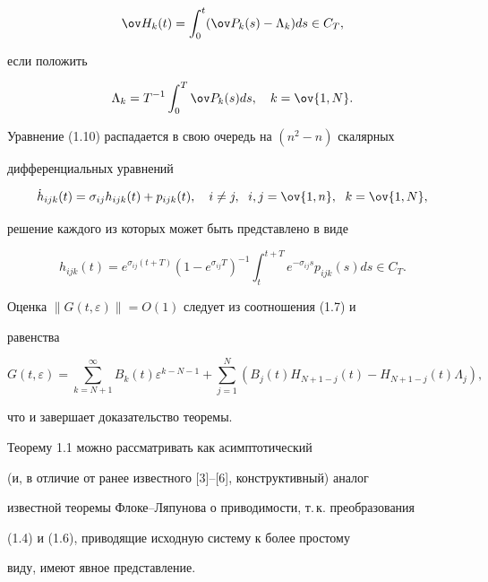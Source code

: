 \begin{pf}
$$ 


\ov H_k(t)=\int^t_0(\ov P_k(s)-\Lambda_k)ds\in C_T, 


$$ 


если положить 


$$ 


\Lambda_k=T^{-1}\int^T_0\ov P_k(s)ds,\quad k=\ov{1,N}. 


$$ 


Уравнение (1.10) распадается в свою очередь на $(n^2-n)$ скалярных  


дифференциальных уравнений 


$$ 


\Dot h_{i j k}(t)=\sigma_{i j}h_{i j k}(t)+ 


p_{i j k}(t),\quad i\ne j,\ \; i,j=\ov{1,n}, 


\ \; k=\ov{1,N}, 


$$ 


решение каждого из которых может быть представлено в виде 


$$ 


h_{i j k}(t)=e^{\sigma_{i j}(t+T)}(1-e^{\sigma_{i j}T})^{-1}


\int^{t+T}_t e^{-\sigma_{i j}s}p_{i j k}(s)ds\in C_T. 


$$ 


Оценка $\|G(t,\varepsilon)\|=O(1)$ следует из соотношения (1.7) и 


равенства 


$$ 


G(t,\varepsilon)=\sum^\infty_{k=N+1}B_k(t) 


\varepsilon^{k-N-1}+\sum^N_{j=1}(B_j(t)H_{N+1-j}(t)- 


H_{N+1-j}(t)\Lambda_j), 


$$ 


что и завершает доказательство теоремы. 


\end{pf} 


 


\begin{notes} 


Теорему 1.1 можно рассматривать как асимптотический  


(и, в отличие от ранее известного [3]--[6], конструктивный) аналог  


известной теоремы Флоке--Ляпунова о приводимости, т.\,к. преобразования 


(1.4) и (1.6), приводящие исходную систему к более простому 


виду, имеют явное представление. 


\end{notes} 



